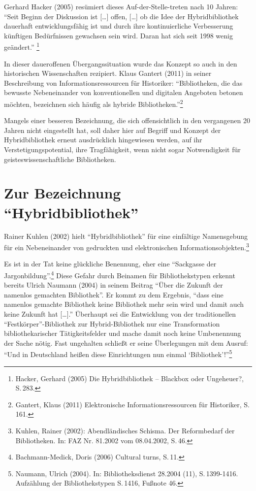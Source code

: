 \documentclass[a4paper,
fontsize=11pt,
oneside,
numbers=noperiodatend,
parskip=half-,
bibliography=totoc,
final
]{scrartcl}
\begin{document}
Gerhard Hacker (2005) resümiert dieses Auf-der-Stelle-treten nach 10
Jahren: \enquote{Seit Beginn der Diskussion ist {[}\ldots{}{]} offen,
{[}\ldots{}{]} ob die Idee der Hybridbibliothek dauerhaft
entwicklungsfähig ist und durch ihre kontinuierliche Verbesserung
künftigen Bedürfnissen gewachsen sein wird. Daran hat sich seit 1998
wenig geändert.} \footnote{Hacker, Gerhard (2005) Die Hybridbibliothek
  -- Blackbox oder Ungeheuer?, S.\,283.}

In dieser daueroffenen Übergangssituation wurde das Konzept so auch in
den historischen Wissenschaften rezipiert. Klaus Gantert (2011) in
seiner Beschreibung von Informationsressourcen für Historiker:
\enquote{Bibliotheken, die das bewusste Nebeneinander von
konventionellen und digitalen Angeboten betonen möchten, bezeichnen sich
häufig als hybride Bibliotheken.}\footnote{Gantert, Klaus (2011)
  Elektronische Informationsressourcen für Historiker, S.\,161.}

Mangels einer besseren Bezeichnung, die sich offensichtlich in den
vergangenen 20 Jahren nicht eingestellt hat, soll daher hier auf Begriff
und Konzept der Hybridbibliothek erneut ausdrücklich hingewiesen werden,
auf ihr Verstetigungspotential, ihre Tragfähigkeit, wenn nicht sogar
Notwendigkeit für geisteswissenschaftliche Bibliotheken.

\section*{\texorpdfstring{Zur Bezeichnung
\enquote{Hybridbibliothek}}{Zur Bezeichnung Hybridbibliothek}}\label{zur-bezeichnung-hybridbibliothek}

Rainer Kuhlen (2002) hielt \enquote{Hybridbibliothek} für eine
einfältige Namensgebung für ein Nebeneinander von gedruckten und
elektronischen Informationsobjekten.\footnote{Kuhlen, Rainer (2002):
  Abendländisches Schisma. Der Reformbedarf der Bibliotheken. In: FAZ
  Nr. 81.2002 vom 08.04.2002, S.\,46.}

Es ist in der Tat keine glückliche Benennung, eher eine
\enquote{Sackgasse der Jargonbildung}.\footnote{Bachmann-Medick, Doris
  (2006) Cultural turns, S.\,11.} Diese Gefahr durch Beinamen für
Bibliothekstypen erkennt bereits Ulrich Naumann (2004) in seinem Beitrag
\enquote{Über die Zukunft der namenlos gemachten Bibliothek}. Er kommt
zu dem Ergebnis, \enquote{dass eine namenlos gemachte Bibliothek keine
Bibliothek mehr sein wird und damit auch keine Zukunft hat
{[}\ldots{}{]}.} Überhaupt sei die Entwicklung von der traditionellen
\enquote{Festkörper}-Bibliothek zur Hybrid-Bibliothek nur eine
Transformation bibliothekarischer Tätigkeitsfelder und mache damit noch
keine Umbenennung der Sache nötig. Fast ungehalten schließt er seine
Überlegungen mit dem Ausruf: \enquote{Und in Deutschland heißen diese
Einrichtungen nun einmal \enquote{Bibliothek}!}\footnote{Naumann, Ulrich
  (2004). In: Bibliotheksdienst 28.2004 (11), S.\,1399-1416. Aufzählung
  der Bibliothekstypen S.\,1416, Fußnote 46.}
\end{document}
